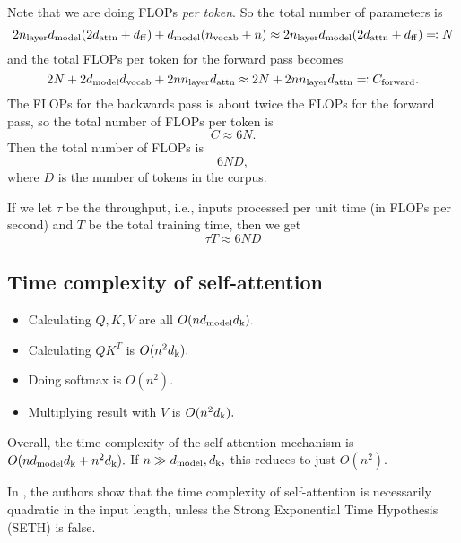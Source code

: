 Note that we are doing FLOPs \textit{per token}. So the total number of parameters is
\begin{equation*}
    2n_{\mathrm{layer}} d_{\mathrm{model}} (2d_{\mathrm{attn}} + d_{\mathrm{ff}}) + d_{\mathrm{model}}(n_{\mathrm{vocab}} + n) \approx 2n_{\mathrm{layer}} d_{\mathrm{model}} (2d_{\mathrm{attn}} + d_{\mathrm{ff}}) \eqqcolon N
\end{equation*}
and the total FLOPs per token for the forward pass becomes
\begin{equation*}
    2N + 2d_{\mathrm{model}} d_{\mathrm{vocab}} + 2n n_{\mathrm{layer}} d_{\mathrm{attn}} \approx 2N + 2n n_{\mathrm{layer}} d_{\mathrm{attn}} \eqqcolon C_{\mathrm{forward}}.
\end{equation*}
The FLOPs for the backwards pass is about twice the FLOPs for the forward pass, so the total number of FLOPs per token is
\begin{equation*}
    C \approx 6N.
\end{equation*}
Then the total number of FLOPs is
\begin{equation*}
    6ND,
\end{equation*}
where $D$ is the number of tokens in the corpus.

If we let $\tau$ be the throughput, i.e., inputs processed per unit time (in FLOPs per second) and $T$ be the total training time, then we get
\begin{equation*}
    \tau T \approx 6ND
\end{equation*}

\subsection{Time complexity of self-attention}

\begin{itemize}
    \item Calculating $Q,K,V$ are all $O(nd_{\mathrm{model}} d_{\mathrm{k}}).$
    \item Calculating $QK^T$ is $O(n^2d_{\mathrm{k}}).$
    \item Doing softmax is $O(n^2).$
    \item Multiplying result with $V$ is $O(n^2d_{\mathrm{k}}).$
\end{itemize}
Overall, the time complexity of the self-attention mechanism is $O(nd_{\mathrm{model}} d_{\mathrm{k}} + n^2d_{\mathrm{k}}).$ If $n \gg d_{\mathrm{model}},d_{\mathrm{k}},$ this reduces to just $O(n^2).$

\begin{remark*}
    In \cite{keles2022computationalcomplexityselfattention}, the authors show that the time complexity of self-attention is necessarily quadratic in the input length, unless the Strong Exponential Time Hypothesis (SETH) is false.
\end{remark*}
